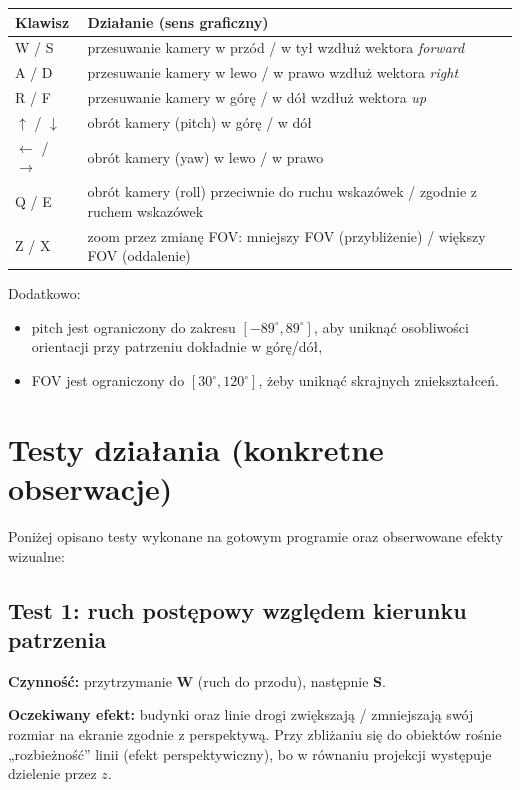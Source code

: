 \documentclass[12pt,a4paper]{article}
\begin{document}
\begin{center}
\begin{tabularx}{\linewidth}{@{}lX@{}}
\toprule
\textbf{Klawisz} & \textbf{Działanie (sens graficzny)} \\
\midrule
W / S & przesuwanie kamery w przód / w tył wzdłuż wektora \textit{forward} \\
A / D & przesuwanie kamery w lewo / w prawo wzdłuż wektora \textit{right} \\
R / F & przesuwanie kamery w górę / w dół wzdłuż wektora \textit{up} \\
\midrule
$\uparrow$ / $\downarrow$ & obrót kamery (pitch) w górę / w dół \\
$\leftarrow$ / $\rightarrow$ & obrót kamery (yaw) w lewo / w prawo \\
Q / E & obrót kamery (roll) przeciwnie do ruchu wskazówek / zgodnie z ruchem wskazówek \\
\midrule
Z / X & zoom przez zmianę FOV: mniejszy FOV (przybliżenie) / większy FOV (oddalenie) \\
\bottomrule
\end{tabularx}
\end{center}

Dodatkowo:
\begin{itemize}
    \item $\text{pitch}$ jest ograniczony do zakresu $[-89^\circ, 89^\circ]$, aby uniknąć osobliwości orientacji przy patrzeniu dokładnie w górę/dół,
    \item FOV jest ograniczony do $[30^\circ, 120^\circ]$, żeby uniknąć skrajnych zniekształceń.
\end{itemize}

\section{Testy działania (konkretne obserwacje)}
Poniżej opisano testy wykonane na gotowym programie oraz obserwowane efekty wizualne:

\subsection{Test 1: ruch postępowy względem kierunku patrzenia}
\textbf{Czynność:} przytrzymanie \textbf{W} (ruch do przodu), następnie \textbf{S}.

\textbf{Oczekiwany efekt:} budynki oraz linie drogi zwiększają / zmniejszają swój rozmiar na ekranie zgodnie z perspektywą.
Przy zbliżaniu się do obiektów rośnie „rozbieżność” linii (efekt perspektywiczny), bo w równaniu projekcji występuje dzielenie przez $z$.
\end{document}
